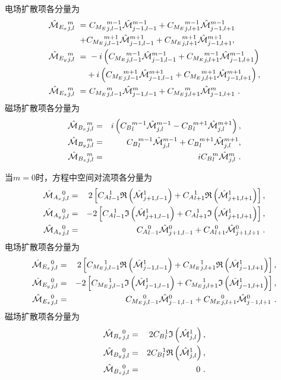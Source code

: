   电场扩散项各分量为
  \begin{eqnarray}
  \begin{aligned}
      \calMhExjlm \ =& \ \CMElnmn \calMhjnlnmn + \CMElpmn \calMhjnlpmn \\ 
      + & \CMElnmp \calMhjnlnmp +  \CMElpmp \calMhjnlpmp , \label{calMhExjlm} 
      \\
      \calMhEyjlm \ =& \ - i \left( \CMElnmn \calMhjnlnmn + \CMElpmn \calMhjnlpmn \right) \\ 
      & + i \left( \CMElnmp \calMhjnlnmp +  \CMElpmp \calMhjnlpmp  \right) , \label{calMhEyjlm} 
      \\
      \calMhEzjlm \ =& \ \CMElnm \calMhjnlnm + \CMElpm \calMhjnlpm ~ . \label{calMhEzjlm}
  \end{aligned}
  \end{eqnarray}
  磁场扩散项各分量为
  \begin{eqnarray}
  \calMhBxjlm &=& i \left( \CBlmn \calMhjlmn - \CBlmp \calMhjlmp \right) , \label{calMhBxjlm} \\
  \calMhByjlm &=& \CBlmn \calMhjlmn + \CBlmp \calMhjlmp , \label{calMhByjlm} \\
  \calMhBzjlm &=& i \CBlm \calMhjlm  ~. \label{calMhBzjlm}
  \end{eqnarray}    
  
  当$m = 0$时，方程中空间对流项各分量为
  \begin{eqnarray}
      \calMhAxjl &=& 2 \left [ \CAlnI \R \left( \calMhjplnI \right) + \CAlpI \R \left( \calMhjplpI \right) \right], \label{calMhAxjl} \\
      \calMhAyjl &=& - 2 \left [ \CAlnI \I \left( \calMhjplnI \right) + \CAlpI \I \left( \calMhjplpI \right) \right] , \label{calMhAyjl} \\  
      \calMhAzjl &=& \CAlno \calMhjplno + \CAlpo \calMhjplpo ~. \label{calMhAzjl}
  \end{eqnarray}
  电场扩散项各分量为
  \begin{eqnarray}
      \calMhExjl &=& 2 \left [ \CMElnI \R \left( \calMhjnlnI \right) + \CMElpI \R \left( \calMhjnlpI \right) \right], \label{calMhExjl} \\
      \calMhEyjl &=& - 2 \left [ \CMElnI \I \left( \calMhjnlnI \right) + \CMElpI \I \left( \calMhjnlpI \right) \right] , \label{calMhEyjl} \\  
      \calMhEzjl &=& \CMElno \calMhjnlno + \CMElpo \calMhjnlpo ~. \label{calMhEzjl}
  \end{eqnarray}
  磁场扩散项各分量为
  \begin{eqnarray}
  \calMhBxjl &=& 2 \CBlI \I \left( \calMhjlI \right), \label{calMhBxjl} \\
  \calMhByjl &=& 2 \CBlI \R \left( \calMhjlI \right) , \label{calMhByjl} \\
  \calMhBzjl &=& 0 ~. \label{calMhBzjl}
  \end{eqnarray}
  
